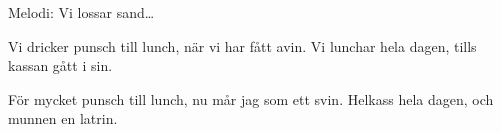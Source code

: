 \begin{song}

\begin{songmeta}
Melodi: Vi lossar sand\ldots
\end{songmeta}

\begin{songtext}
Vi dricker punsch
till lunch,
när vi har fått avin.
Vi lunchar hela dagen,
tills kassan gått i sin.

För mycket punsch
till lunch,
nu mår jag som ett svin.
Helkass hela dagen,
och munnen en latrin.
\end{songtext}
\end{song}
